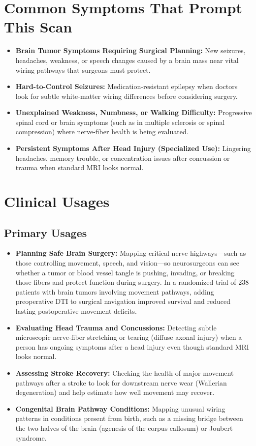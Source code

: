 \section{Common Symptoms That Prompt This Scan}
\begin{itemize}
    \item \textbf{Brain Tumor Symptoms Requiring Surgical Planning:} New seizures, headaches, weakness, or speech changes caused by a brain mass near vital wiring pathways that surgeons must protect.
    \item \textbf{Hard-to-Control Seizures:} Medication-resistant epilepsy when doctors look for subtle white-matter wiring differences before considering surgery.
    \item \textbf{Unexplained Weakness, Numbness, or Walking Difficulty:} Progressive spinal cord or brain symptoms (such as in multiple sclerosis or spinal compression) where nerve-fiber health is being evaluated.
    \item \textbf{Persistent Symptoms After Head Injury (Specialized Use):} Lingering headaches, memory trouble, or concentration issues after concussion or trauma when standard MRI looks normal.
\end{itemize}

\section{Clinical Usages}

\subsection{Primary Usages}

\begin{itemize}
    \item \textbf{Planning Safe Brain Surgery:} Mapping critical nerve highways---such as those controlling movement, speech, and vision---so neurosurgeons can see whether a tumor or blood vessel tangle is pushing, invading, or breaking those fibers and protect function during surgery. In a randomized trial of 238 patients with brain tumors involving movement pathways, adding preoperative DTI to surgical navigation improved survival and reduced lasting postoperative movement deficits.
    \item \textbf{Evaluating Head Trauma and Concussions:} Detecting subtle microscopic nerve-fiber stretching or tearing (diffuse axonal injury) when a person has ongoing symptoms after a head injury even though standard MRI looks normal.
    \item \textbf{Assessing Stroke Recovery:} Checking the health of major movement pathways after a stroke to look for downstream nerve wear (Wallerian degeneration) and help estimate how well movement may recover.
    \item \textbf{Congenital Brain Pathway Conditions:} Mapping unusual wiring patterns in conditions present from birth, such as a missing bridge between the two halves of the brain (agenesis of the corpus callosum) or Joubert syndrome.
\end{itemize}

